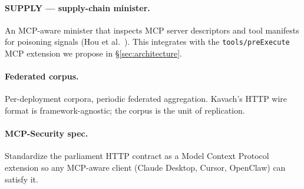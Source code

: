 \documentclass[11pt]{article}
\begin{document}
\paragraph{SUPPLY — supply-chain minister.} An MCP-aware minister that
inspects MCP server descriptors and tool manifests for poisoning signals
(Hou et al.\ \cite{hou2025mcp}). This integrates with the
\texttt{tools/preExecute} MCP extension we propose in
\S\ref{sec:architecture}.

\paragraph{Federated corpus.} Per-deployment corpora, periodic
federated aggregation. Kavach's HTTP wire format is framework-agnostic;
the corpus is the unit of replication.

\paragraph{MCP-Security spec.} Standardize the parliament HTTP contract
as a Model Context Protocol extension so any MCP-aware client (Claude
Desktop, Cursor, OpenClaw) can satisfy it.



\end{document}

